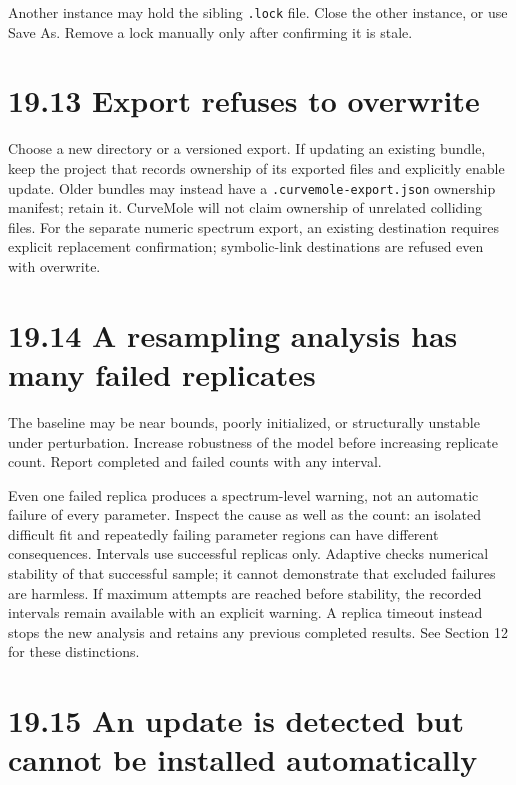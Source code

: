 \documentclass[
  10pt,
  a4paper,
  oneside]{scrreprt}
\begin{document}
Another instance may hold the sibling \texttt{.lock} file. Close the
other instance, or use Save As. Remove a lock manually only after
confirming it is stale.

\hypertarget{export-refuses-to-overwrite}{%
\section{19.13 Export refuses to
overwrite}\label{export-refuses-to-overwrite}}

Choose a new directory or a versioned export. If updating an existing
bundle, keep the project that records ownership of its exported files
and explicitly enable update. Older bundles may instead have a
\texttt{.curvemole-export.json} ownership manifest; retain it. CurveMole
will not claim ownership of unrelated colliding files. For the separate
numeric spectrum export, an existing destination requires explicit
replacement confirmation; symbolic-link destinations are refused even
with overwrite.

\hypertarget{a-resampling-analysis-has-many-failed-replicates}{%
\section{19.14 A resampling analysis has many failed
replicates}\label{a-resampling-analysis-has-many-failed-replicates}}

The baseline may be near bounds, poorly initialized, or structurally
unstable under perturbation. Increase robustness of the model before
increasing replicate count. Report completed and failed counts with any
interval.

Even one failed replica produces a spectrum-level warning, not an
automatic failure of every parameter. Inspect the cause as well as the
count: an isolated difficult fit and repeatedly failing parameter
regions can have different consequences. Intervals use successful
replicas only. Adaptive checks numerical stability of that successful
sample; it cannot demonstrate that excluded failures are harmless. If
maximum attempts are reached before stability, the recorded intervals
remain available with an explicit warning. A replica timeout instead
stops the new analysis and retains any previous completed results. See
Section 12 for these distinctions.

\hypertarget{an-update-is-detected-but-cannot-be-installed-automatically}{%
\section{19.15 An update is detected but cannot be installed
automatically}\label{an-update-is-detected-but-cannot-be-installed-automatically}}
\end{document}

